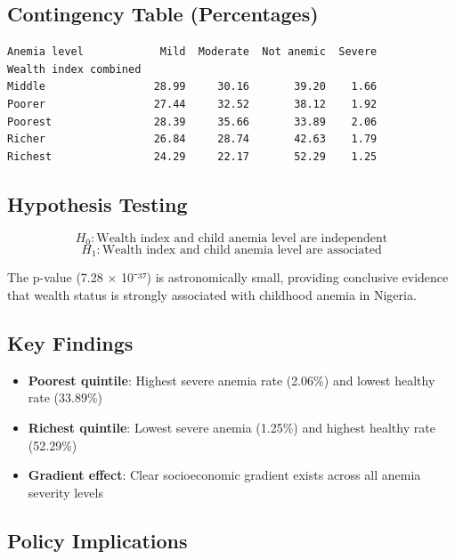 \documentclass[12pt, a4paper]{article}
\begin{document}
\subsection*{Contingency Table (Percentages)}

\begin{outputbox}
\begin{verbatim}
Anemia level            Mild  Moderate  Not anemic  Severe
Wealth index combined                                     
Middle                 28.99     30.16       39.20    1.66
Poorer                 27.44     32.52       38.12    1.92
Poorest                28.39     35.66       33.89    2.06
Richer                 26.84     28.74       42.63    1.79
Richest                24.29     22.17       52.29    1.25
\end{verbatim}
\end{outputbox}

\subsection*{Hypothesis Testing}

\[
H_0: \text{Wealth index and child anemia level are independent}
\]
\[
H_1: \text{Wealth index and child anemia level are associated}
\]

\begin{insightbox}
The p-value (7.28 × 10⁻³⁷) is astronomically small, providing conclusive evidence that wealth status is strongly associated with childhood anemia in Nigeria.
\end{insightbox}

\subsection*{Key Findings}

\begin{itemize}
    \item \textbf{Poorest quintile}: Highest severe anemia rate (2.06\%) and lowest healthy rate (33.89\%)
    \item \textbf{Richest quintile}: Lowest severe anemia (1.25\%) and highest healthy rate (52.29\%)
    \item \textbf{Gradient effect}: Clear socioeconomic gradient exists across all anemia severity levels
\end{itemize}

\subsection*{Policy Implications}
\end{document}
